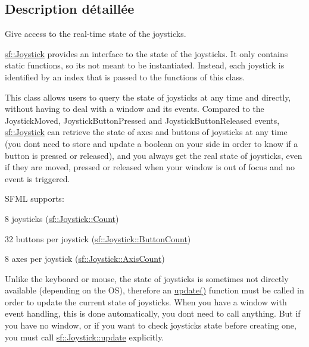 \subsection{Description détaillée}
Give access to the real-\/time state of the joysticks. 

\hyperlink{classsf_1_1Joystick}{sf\+::\+Joystick} provides an interface to the state of the joysticks. It only contains static functions, so it\textquotesingle{}s not meant to be instantiated. Instead, each joystick is identified by an index that is passed to the functions of this class.

This class allows users to query the state of joysticks at any time and directly, without having to deal with a window and its events. Compared to the Joystick\+Moved, Joystick\+Button\+Pressed and Joystick\+Button\+Released events, \hyperlink{classsf_1_1Joystick}{sf\+::\+Joystick} can retrieve the state of axes and buttons of joysticks at any time (you don\textquotesingle{}t need to store and update a boolean on your side in order to know if a button is pressed or released), and you always get the real state of joysticks, even if they are moved, pressed or released when your window is out of focus and no event is triggered.

S\+F\+ML supports\+: \begin{DoxyItemize}
\item 8 joysticks (\hyperlink{classsf_1_1Joystick_a951a7c775921304a5f3443c6e2bb4d65a6e0a2a95bc1da277610c04d80f52715e}{sf\+::\+Joystick\+::\+Count}) \item 32 buttons per joystick (\hyperlink{classsf_1_1Joystick_a951a7c775921304a5f3443c6e2bb4d65a2f1b8a0a59f2c12a4775c0e1e69e1816}{sf\+::\+Joystick\+::\+Button\+Count}) \item 8 axes per joystick (\hyperlink{classsf_1_1Joystick_a951a7c775921304a5f3443c6e2bb4d65accf3e487c9f6ee2f384351323626a42c}{sf\+::\+Joystick\+::\+Axis\+Count})\end{DoxyItemize}
Unlike the keyboard or mouse, the state of joysticks is sometimes not directly available (depending on the OS), therefore an \hyperlink{classsf_1_1Joystick_ab85fa9175b4edd3e5a07ee3cde0b0f48}{update()} function must be called in order to update the current state of joysticks. When you have a window with event handling, this is done automatically, you don\textquotesingle{}t need to call anything. But if you have no window, or if you want to check joysticks state before creating one, you must call \hyperlink{classsf_1_1Joystick_ab85fa9175b4edd3e5a07ee3cde0b0f48}{sf\+::\+Joystick\+::update} explicitly.

